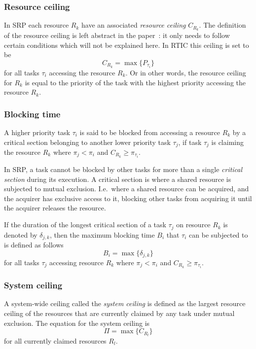 \subsubsection{Resource ceiling}\label{theory:srp:definitions:resource}
In SRP each resource $R_k$ have an associated \emph{resource ceiling}
$C_{R_k}$. The definition of the resource ceiling is left abstract in the
paper~\cite{srp}: it only needs to follow certain conditions which will not be
explained here. In RTIC this ceiling is set to be
\begin{equation}
    C_{R_k} = \max\{P_{\tau_i}\}
\end{equation}
for all tasks $\tau_i$ accessing the resource $R_k$. Or in other words,
the resource ceiling for $R_k$ is equal to the priority of the task with the
highest priority accessing the resource $R_k$.

\subsubsection{Blocking time}\label{theory:srp:definitions:blocking}
A higher priority task $\tau_i$ is said to be blocked from accessing a resource
$R_k$ by a critical section belonging to another lower priority task $\tau_j$,
if task $\tau_j$ is claiming the resource $R_k$ where $\pi_j < \pi_i$ and
$C_{R_k} \geq \pi_{\tau_i}$.

In SRP, a task cannot be blocked by other tasks for more than a single
\emph{critical section} during its execution. A critical section is where a
shared resource is subjected to mutual exclusion. I.e.\ where a shared resource
can be acquired, and the acquirer has exclusive access to it, blocking other
tasks from acquiring it until the acquirer releases the resource.

If the duration of the longest critical section of a task $\tau_j$ on resource
$R_k$ is denoted by $\delta_{j,k}$, then the maximum blocking time $B_i$
that $\tau_i$ can be subjected to is defined as follows
\begin{equation}
    B_i = \max\{\delta_{j,k}\}
\end{equation}
for all tasks $\tau_j$ accessing resource $R_k$ where $\pi_j < \pi_i$ and
$C_{R_k} \geq \pi_{\tau_i}$.

\subsubsection{System ceiling}\label{theory:srp:definitions:system}
A system-wide ceiling called the \emph{system ceiling} is defined as the
largest resource ceiling of the resources that are currently claimed by
any task under mutual exclusion. The equation for the system ceiling is
\begin{equation}
    \Pi = \max\{C_{R_l}\}
\end{equation}
for all currently claimed resources $R_l$.

